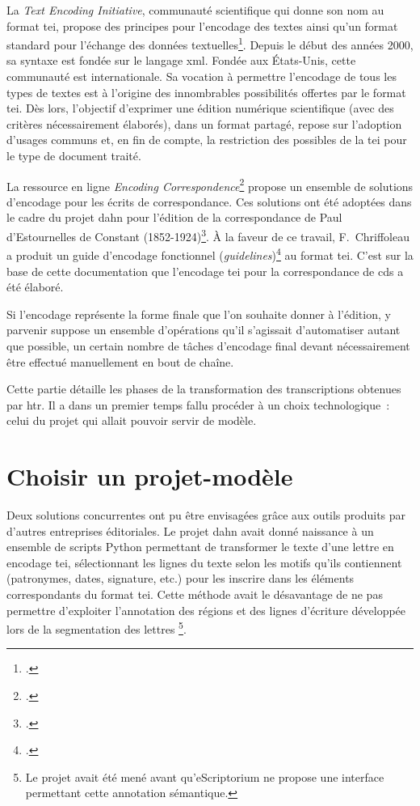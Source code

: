 \documentclass[a4paper,12pt,twoside]{book}
\begin{document}
		La \textit{Text Encoding Initiative}, communauté scientifique qui donne son nom au format \gls{tei}, propose des principes pour l'encodage des textes ainsi qu'un format standard pour l'échange des données textuelles\footcite{TEITextEncoding}. Depuis le début des années 2000, sa syntaxe est fondée sur le langage \gls{xml}. Fondée aux États-Unis, cette communauté est internationale. Sa vocation à permettre l'encodage de tous les types de textes est à l'origine des innombrables possibilités offertes par le format \gls{tei}. Dès lors, l'objectif d'exprimer une édition numérique scientifique (avec des critères nécessairement élaborés), dans un format partagé, repose sur l'adoption d'usages communs et, en fin de compte, la restriction des possibles de la \gls{tei} pour le type de document traité. 
		
		La ressource en ligne \textit{Encoding Correspondence}\footcite{dumontEncodingCorrespondenceManual2019} propose un ensemble de solutions d'encodage pour les écrits de correspondance. Ces solutions ont été adoptées dans le cadre du projet \gls{dahn} pour l'édition de la correspondance de Paul d’Estournelles de Constant (1852-1924)\footcite{chiffoleauEncodingXMLTree2020}. À la faveur de ce travail, F.~Chriffoleau a produit un guide d'encodage fonctionnel (\textit{guidelines})\footcite{chiffoleauCorrespondenceGuidelines2022} au format \gls{tei}. C'est sur la base de cette documentation que l'encodage \gls{tei} pour la correspondance de \gls{cds} a été élaboré.
		
		Si l'encodage représente la forme finale que l'on souhaite donner à l'édition, y parvenir suppose un ensemble d'opérations qu'il s'agissait d'automatiser autant que possible, un certain nombre de tâches d'encodage final devant nécessairement être effectué manuellement en bout de chaîne.
		
		Cette partie détaille les phases de la transformation des transcriptions obtenues par \gls{htr}. Il a dans un premier temps fallu procéder à un choix technologique~: celui du projet qui allait pouvoir servir de modèle.
		
		\section{Choisir un projet-modèle}
			
			Deux solutions concurrentes ont pu être envisagées grâce aux outils produits par d'autres entreprises éditoriales. Le projet \gls{dahn} avait donné naissance à un ensemble de scripts Python permettant de transformer le texte d'une lettre en encodage \gls{tei}, sélectionnant les lignes du texte selon les motifs qu'ils contiennent (patronymes, dates, signature, etc.) pour les inscrire dans les éléments correspondants du format \gls{tei}. Cette méthode avait le désavantage de ne pas permettre d'exploiter l'annotation des régions et des lignes d'écriture développée lors de la \gls{segmentation} des lettres
			\footnote{Le projet avait été mené avant qu'eScriptorium ne propose une interface permettant cette annotation sémantique.}.
			
\end{document}
